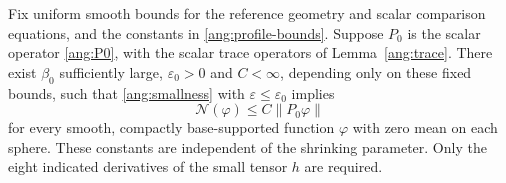 \begin{proposition}
\label{ang:scalar-coercivity}
Fix uniform smooth bounds for the reference geometry and scalar
comparison equations, and the constants in \eqref{ang:profile-bounds}.
Suppose $P_0$ is the scalar operator
\eqref{ang:P0}, with the scalar trace operators of
Lemma~\ref{ang:trace}.  There exist $\beta_0$ sufficiently large,
$\varepsilon_0>0$ and $C<\infty$, depending only on these fixed bounds, such that
\eqref{ang:smallness} with $\varepsilon\le\varepsilon_0$ implies
\begin{equation}\label{ang:coercive-estimate}
 \mathcal N(\varphi)\le C\|P_0\varphi\|
\end{equation}
for every smooth, compactly base-supported function $\varphi$ with
zero mean on each sphere.  These constants are independent of the
shrinking parameter.  Only the eight indicated derivatives of the small
tensor $h$ are required.
\end{proposition}

